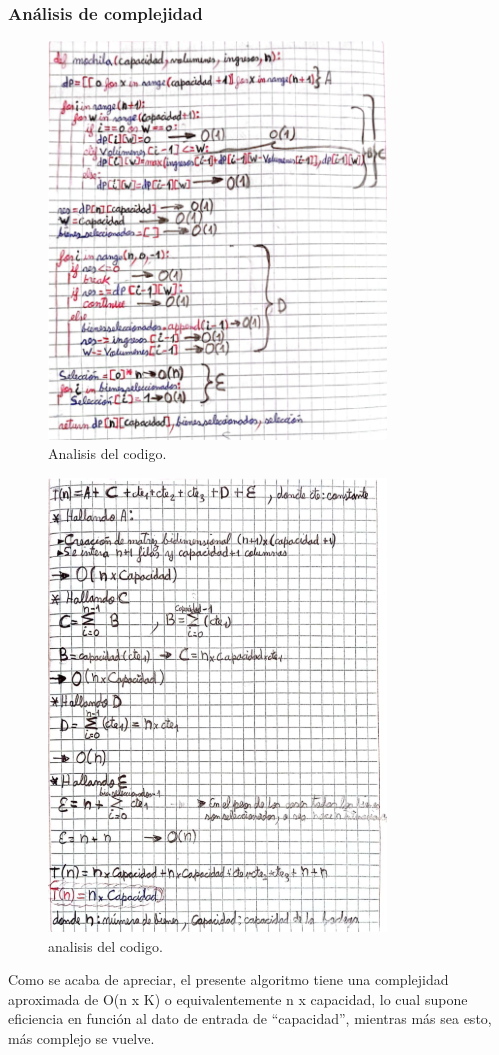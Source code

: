 \subsubsection{Análisis de complejidad}
\begin{figure}[H]
	\centering
	\includegraphics[width=0.8\textwidth]{complejidad_mochila_ejem2.png}
	\caption{Analisis del codigo.}
	\label{fig:complejidad1}
\end{figure}

\begin{figure}[H]
	\centering
	\includegraphics[width=0.8\textwidth]{complejidad_mochila_ejem2_2.png}
	\caption{analisis del codigo.}
	\label{fig:complejidad2}
\end{figure}

Como se acaba de apreciar, el presente algoritmo tiene una complejidad aproximada de O(n x K) o equivalentemente  n x capacidad, lo cual supone eficiencia en función al dato de entrada de “capacidad”, mientras más sea esto, más complejo se vuelve.
